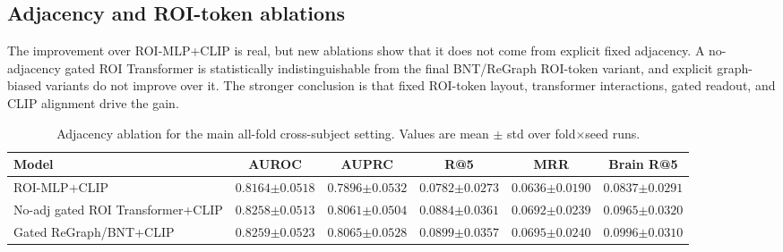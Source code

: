 \documentclass{article}
\begin{document}
\subsection{Adjacency and ROI-token ablations}

The improvement over ROI-MLP+CLIP is real, but new ablations show that it does not come from explicit fixed adjacency. A no-adjacency gated ROI Transformer is statistically indistinguishable from the final BNT/ReGraph ROI-token variant, and explicit graph-biased variants do not improve over it. The stronger conclusion is that fixed ROI-token layout, transformer interactions, gated readout, and CLIP alignment drive the gain.

\begin{table}[!htbp]
  \centering
  \caption{Adjacency ablation for the main all-fold cross-subject setting. Values are mean $\pm$ std over fold$\times$seed runs.}
  \label{tab:adjacency_ablation}
  \scriptsize
  \setlength{\tabcolsep}{4pt}
  \renewcommand{\arraystretch}{1.15}
  \begin{tabular}{lccccc}
    \toprule
    Model & AUROC & AUPRC & R@5 & MRR & Brain R@5 \\
    \midrule
    ROI-MLP+CLIP & $0.8164{\scriptstyle\pm0.0518}$ & $0.7896{\scriptstyle\pm0.0532}$ & $0.0782{\scriptstyle\pm0.0273}$ & $0.0636{\scriptstyle\pm0.0190}$ & $0.0837{\scriptstyle\pm0.0291}$ \\
    No-adj gated ROI Transformer+CLIP & $0.8258{\scriptstyle\pm0.0513}$ & $0.8061{\scriptstyle\pm0.0504}$ & $0.0884{\scriptstyle\pm0.0361}$ & $0.0692{\scriptstyle\pm0.0239}$ & $0.0965{\scriptstyle\pm0.0320}$ \\
    Gated ReGraph/BNT+CLIP & $0.8259{\scriptstyle\pm0.0523}$ & $0.8065{\scriptstyle\pm0.0528}$ & $0.0899{\scriptstyle\pm0.0357}$ & $0.0695{\scriptstyle\pm0.0240}$ & $0.0996{\scriptstyle\pm0.0310}$ \\
    \bottomrule
  \end{tabular}
\end{table}
\end{document}
